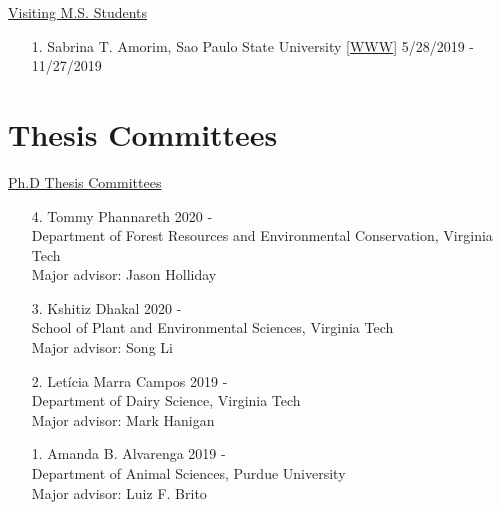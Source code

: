 \documentclass[margin,line,10pt]{res}
\begin{document}
\begin{resume}
\begin{flushleft}
\hspace{0.2cm} \underline{Visiting M.S. Students}
\end{flushleft}
\begin{enumerate}
\item [1.] Sabrina T. Amorim, Sao Paulo State University [\textcolor{blue}{\href{https://sabrinaam.github.io/}{WWW}}]  \hfill 5/28/2019 - 11/27/2019
\end{enumerate}


\vspace{0.5cm}
\section{\sc Thesis Committees}

\begin{flushleft}
\hspace{0.2cm} \underline{Ph.D Thesis Committees}
\end{flushleft}
\begin{enumerate}
  \item [4.] Tommy Phannareth \hfill 2020 - \\
  Department of Forest Resources and Environmental Conservation, Virginia Tech \\
  Major advisor: Jason Holliday

  \vspace{0.3cm}
  
  \item [3.] Kshitiz Dhakal \hfill 2020 - \\
  School of Plant and Environmental Sciences,  Virginia Tech \\
  Major advisor: Song Li

  \vspace{0.3cm}

  \item [2.] Let\'{i}cia Marra Campos  \hfill 2019 - \\
  Department of Dairy Science,  Virginia Tech \\ 
  Major advisor: Mark Hanigan

  \vspace{0.3cm}

\item [1.] Amanda B. Alvarenga   \hfill 2019 - \\
  Department of Animal Sciences, Purdue University \\
  Major advisor: Luiz F. Brito
\end{enumerate}



\end{resume}
\end{document}
